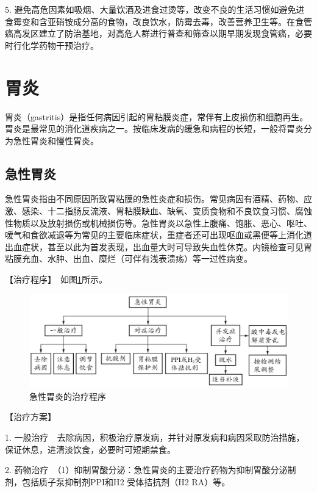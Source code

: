 5.
避免高危因素如吸烟、大量饮酒及进食过烫等，改变不良的生活习惯如避免进食霉变和含亚硝铵成分高的食物，改良饮水，防霉去毒，改善营养卫生等。在食管癌高发区建立了防治基地，对高危人群进行普查和筛查以期早期发现食管癌，必要时行化学药物干预治疗。


\section{胃炎}

胃炎（gastritis）是指任何病因引起的胃粘膜炎症，常伴有上皮损伤和细胞再生。胃炎是最常见的消化道疾病之一。按临床发病的缓急和病程的长短，一般将胃炎分为急性胃炎和慢性胃炎。

\subsection{急性胃炎}

急性胃炎指由不同原因所致胃粘膜的急性炎症和损伤。常见病因有酒精、药物、应激、感染、十二指肠反流液、胃粘膜缺血、缺氧、变质食物和不良饮食习惯、腐蚀性物质以及放射损伤或机械损伤等。急性胃炎以急性上腹痛、饱胀、恶心、呕吐、嗳气和食欲减退等为常见的主要临床症状，重症者还可出现呕血或黑便等上消化道出血症状，甚至以此为首发表现，出血量大时可导致失血性休克。内镜检查可见胃粘膜充血、水肿、出血、糜烂（可伴有浅表溃疡）等一过性病变。

【治疗程序】　如图\ref{fig3-2-1}所示。

\begin{figure}[!htbp]
 \centering
 \includegraphics{./images/Image00087.jpg}
 \captionsetup{justification=centering}
 \caption{急性胃炎的治疗程序}
 \label{fig3-2-1}
  \end{figure} 

【治疗方案】

1.
一般治疗　去除病因，积极治疗原发病，并针对原发病和病因采取防治措施，保证休息，进清淡饮食，必要时可短期禁食。

2.
药物治疗　（1）抑制胃酸分泌：急性胃炎的主要治疗药物为抑制胃酸分泌制剂，包括质子泵抑制剂PPI和H{2}
受体拮抗剂（H{2} RA）等。

